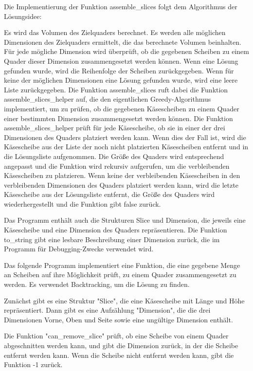 \documentclass[a4paper,10pt,ngerman]{scrartcl}
\begin{document}
    Die Implementierung der Funktion assemble\_slices folgt dem Algorithmus der Lösungsidee:

    Es wird das Volumen des Zielquaders berechnet.
    Es werden alle möglichen Dimensionen des Zielquaders ermittelt, die das berechnete Volumen beinhalten.
    Für jede mögliche Dimension wird überprüft, ob die gegebenen Scheiben zu einem Quader dieser Dimension zusammengesetzt werden können.
    Wenn eine Lösung gefunden wurde, wird die Reihenfolge der Scheiben zurückgegeben.
    Wenn für keine der möglichen Dimensionen eine Lösung gefunden wurde, wird eine leere Liste zurückgegeben.
    Die Funktion assemble\_slices ruft dabei die Funktion assemble\_slices\_helper auf, die den eigentlichen Greedy-Algorithmus implementiert,
    um zu prüfen, ob die gegebenen Käsescheiben zu einem Quader einer bestimmten Dimension zusammengesetzt werden können.
    Die Funktion assemble\_slices\_helper prüft für jede Käsescheibe, ob sie in einer der drei Dimensionen des Quaders platziert werden kann.
    Wenn dies der Fall ist, wird die Käsescheibe aus der Liste der noch nicht platzierten Käsescheiben entfernt und in die Lösungsliste aufgenommen.
    Die Größe des Quaders wird entsprechend angepasst und die Funktion wird rekursiv aufgerufen, um die verbleibenden Käsescheiben zu platzieren.
    Wenn keine der verbleibenden Käsescheiben in den verbleibenden Dimensionen des Quaders platziert werden kann, wird die letzte Käsescheibe aus der Lösungsliste entfernt, die Größe des Quaders wird wiederhergestellt und die Funktion gibt false zurück.

    Das Programm enthält auch die Strukturen Slice und Dimension, die jeweils eine Käsescheibe und eine Dimension des Quaders repräsentieren.
    Die Funktion to\_string gibt eine lesbare Beschreibung einer Dimension zurück, die im Programm für Debugging-Zwecke verwendet wird.

    Das folgende Programm implementiert eine Funktion, die eine gegebene Menge an Scheiben auf ihre Möglichkeit prüft, zu einem Quader zusammengesetzt zu werden.
    Es verwendet Backtracking, um die Lösung zu finden.

    Zunächst gibt es eine Struktur "Slice", die eine Käsescheibe mit Länge und Höhe repräsentiert.
    Dann gibt es eine Aufzählung "Dimension", die die drei Dimensionen Vorne, Oben und Seite sowie eine ungültige Dimension enthält.

    Die Funktion "can\_remove\_slice" prüft, ob eine Scheibe von einem Quader abgeschnitten werden kann, und gibt die Dimension zurück, in der die Scheibe entfernt werden kann.
    Wenn die Scheibe nicht entfernt werden kann, gibt die Funktion -1 zurück.
\end{document}
